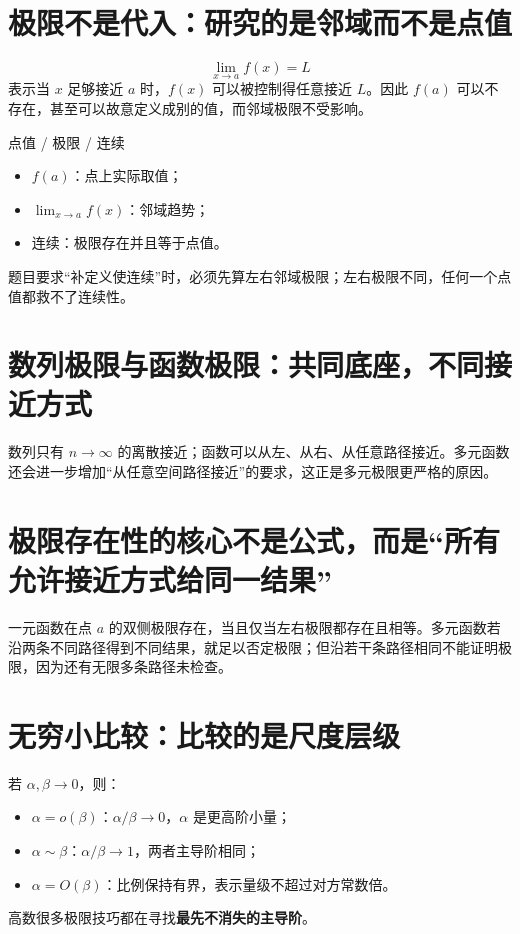 \documentclass[11pt,a4paper,openany]{ctexbook}
\newcommand{\key}[1]{\textbf{\color{deep}#1}}
\begin{document}
\section{极限不是代入：研究的是邻域而不是点值}
\[
\lim_{x\to a}f(x)=L
\]
表示当 $x$ 足够接近 $a$ 时，$f(x)$ 可以被控制得任意接近 $L$。因此 $f(a)$ 可以不存在，甚至可以故意定义成别的值，而邻域极限不受影响。

\begin{boundarybox}{点值 / 极限 / 连续}
\begin{itemize}
  \item $f(a)$：点上实际取值；
  \item $\lim_{x\to a}f(x)$：邻域趋势；
  \item 连续：极限存在并且等于点值。
\end{itemize}
题目要求“补定义使连续”时，必须先算左右邻域极限；左右极限不同，任何一个点值都救不了连续性。
\end{boundarybox}

\section{数列极限与函数极限：共同底座，不同接近方式}
数列只有 $n\to\infty$ 的离散接近；函数可以从左、从右、从任意路径接近。多元函数还会进一步增加“从任意空间路径接近”的要求，这正是多元极限更严格的原因。

\section{极限存在性的核心不是公式，而是“所有允许接近方式给同一结果”}
一元函数在点 $a$ 的双侧极限存在，当且仅当左右极限都存在且相等。多元函数若沿两条不同路径得到不同结果，就足以否定极限；但沿若干条路径相同不能证明极限，因为还有无限多条路径未检查。

\section{无穷小比较：比较的是尺度层级}
若 $\alpha,\beta\to0$，则：
\begin{itemize}
  \item $\alpha=o(\beta)$：$\alpha/\beta\to0$，$\alpha$ 是更高阶小量；
  \item $\alpha\sim\beta$：$\alpha/\beta\to1$，两者主导阶相同；
  \item $\alpha=O(\beta)$：比例保持有界，表示量级不超过对方常数倍。
\end{itemize}
高数很多极限技巧都在寻找\key{最先不消失的主导阶}。
\end{document}
